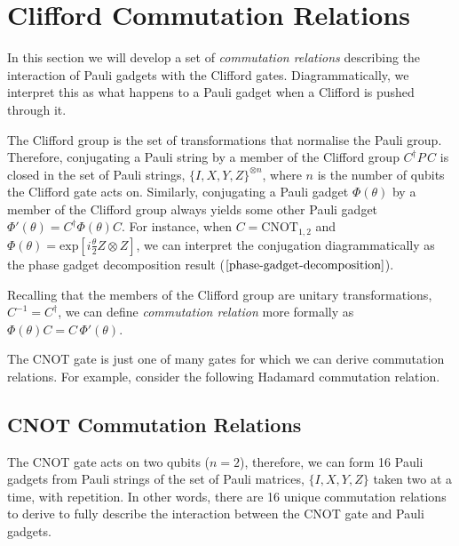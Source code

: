 \section{Clifford Commutation Relations}

In this section we will develop a set of \textit{commutation relations} describing the interaction of Pauli gadgets with the Clifford gates. Diagrammatically, we interpret this as what happens to a Pauli gadget when a Clifford is pushed through it.

The Clifford group is the set of transformations that normalise the Pauli group. Therefore, conjugating a Pauli string by a member of the Clifford group $C^\dagger P \, C$ is closed in the set of Pauli strings, $\{I, X, Y, Z\}^{\otimes n}$, where $n$ is the number of qubits the Clifford gate acts on. Similarly, conjugating a Pauli gadget $\Phi(\theta)$ by a member of the Clifford group always yields some other Pauli gadget $\Phi'(\theta) = C^\dagger \Phi(\theta) C$. For instance, when $C = \text{CNOT}_{1, 2}$ and $\Phi(\theta) = \text{exp} \left[ i\frac{\theta}{2} Z \otimes Z \right]$, we can interpret the conjugation diagrammatically as the phase gadget decomposition result ($\ref{phase-gadget-decomposition}$).


Recalling that the members of the Clifford group are unitary transformations, $C^{-1} = C^\dagger$, we can define \textit{commutation relation} more formally as $\Phi(\theta) C = C \, \Phi'(\theta)$.


The CNOT gate is just one of many gates for which we can derive commutation relations. For example, consider the following Hadamard commutation relation.



\subsection{CNOT Commutation Relations}

The CNOT gate acts on two qubits ($n = 2$), therefore, we can form 16 Pauli gadgets from Pauli strings of the set of Pauli matrices, $\{I, X, Y, Z\}$ taken two at a time, with repetition. In other words, there are 16 unique commutation relations to derive to fully describe the interaction between the CNOT gate and Pauli gadgets.

